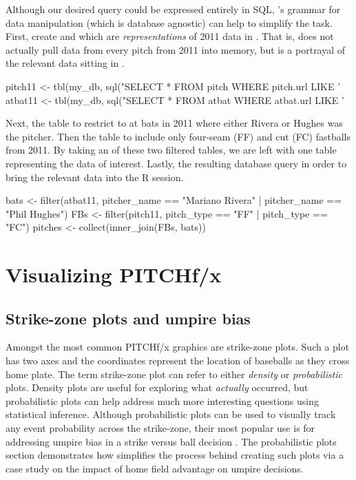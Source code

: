 \begin{article}
Although our desired query could be expressed entirely in SQL, 's
grammar for data manipulation (which is database agnostic) can help
to simplify the task. First, create  and 
which are \emph{representations} of 2011 data in .
That is,  does not actually pull data from every pitch
from 2011 into memory, but is a portrayal of the relevant data sitting
in .
%
\begin{Schunk}
\begin{Sinput}
pitch11 <- tbl(my_db, sql("SELECT * FROM pitch WHERE pitch.url LIKE '%
atbat11 <- tbl(my_db, sql("SELECT * FROM atbat WHERE atbat.url LIKE '%
\end{Sinput}
\end{Schunk}
%
Next,  the  table to restrict to at bats
in 2011 where either Rivera or Hughes was the pitcher. Then 
the  table to include only four-seam (FF) and cut (FC)
fastballs from 2011. By taking an  of these two
filtered tables, we are left with one table representing the data
of interest. Lastly,  the resulting database query
in order to bring the relevant data into the R session.
%
\begin{Schunk}
\begin{Sinput}
bats <- filter(atbat11, 
  pitcher_name == "Mariano Rivera" | pitcher_name == "Phil Hughes")
FBs <- filter(pitch11, pitch_type == "FF" | pitch_type == "FC")
pitches <- collect(inner_join(FBs, bats))
\end{Sinput}
\end{Schunk}
%


\section{Visualizing PITCHf/x}


\subsection{Strike-zone plots and umpire bias}

Amongst the most common PITCHf/x graphics are strike-zone plots. Such
a plot has two axes and the coordinates represent the location of
baseballs as they cross home plate. The term strike-zone plot can
refer to either \emph{density} or \emph{probabilistic} plots. Density
plots are useful for exploring what \emph{actually} occurred, but
probabilistic plots can help address much more interesting questions
using statistical inference. Although probabilistic plots can be used
to visually track any event probability across the strike-zone, their
most popular use is for addressing umpire bias in a strike versus
ball decision \citet{bias}. The probabilistic plots section demonstrates
how  simplifies the process behind creating such plots
via a case study on the impact of home field advantage on umpire decisions.


\end{article}
